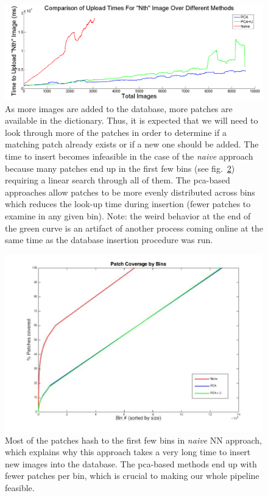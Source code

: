  \begin{figure}
\hspace{-10mm}
\centering
\includegraphics[width=1\linewidth]{Figures/upload_times.png}
\caption{As more images are added to the database, more patches are available in the dictionary. Thus, it is expected that we will need to look through more of the patches in order to determine if a matching patch already exists or if a new one should be added. The time to insert becomes infeasible in the case of the \emph{naive} approach because many patches end up in the first few bins (see fig.~\ref{fig:bin_cover}) requiring a linear search through all of them. The pca-based approaches allow patches to be more evenly distributed across bins which reduces the look-up time during insertion (fewer patches to examine in any given bin). Note: the weird behavior at the end of the green curve is an artifact of another process coming online at the same time as the database insertion procedure was run.}
\label{fig:upload_times}
\end{figure}

 \begin{figure}
\includegraphics[width=1\linewidth]{fig_NN/bin_cover.jpg}
\caption{Most of the patches hash to the first few bins in \emph{naive} NN approach, which explains why this approach takes a very long time to insert new images into the database. The pca-based methods end up with fewer patches per bin, which is crucial to making our whole pipeline feasible.}
\label{fig:bin_cover}
\end{figure}

